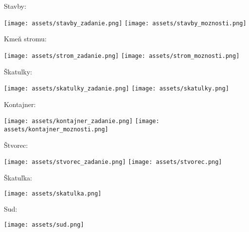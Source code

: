 \begin{example}
	Stavby:
	
	\begin{center}
		\texttt{[image: assets/stavby\_zadanie.png]}
		\texttt{[image: assets/stavby\_moznosti.png]}
	\end{center}
\end{example}

\begin{example}
	Kmeň stromu:
	
	\begin{center}
		\texttt{[image: assets/strom\_zadanie.png]}
		\texttt{[image: assets/strom\_moznosti.png]}
	\end{center}
\end{example}

\begin{example}
	Škatulky:
	
	\begin{center}
		\texttt{[image: assets/skatulky\_zadanie.png]}
		\texttt{[image: assets/skatulky.png]}
	\end{center}
\end{example}

\begin{example}
	Kontajner:
	
	\begin{center}
		\texttt{[image: assets/kontajner\_zadanie.png]}
		\texttt{[image: assets/kontajner\_moznosti.png]}
	\end{center}
\end{example}

\begin{example}
	Štvorec:
	
	\begin{center}
		\texttt{[image: assets/stvorec\_zadanie.png]}
		\texttt{[image: assets/stvorec.png]}
	\end{center}
\end{example}

\begin{example}
	Škatuľka:
	
	\begin{center}
		\texttt{[image: assets/skatulka.png]}
	\end{center}
\end{example}

\begin{example}
	Sud:
	
	\begin{center}
		\texttt{[image: assets/sud.png]}
	\end{center}
\end{example}

